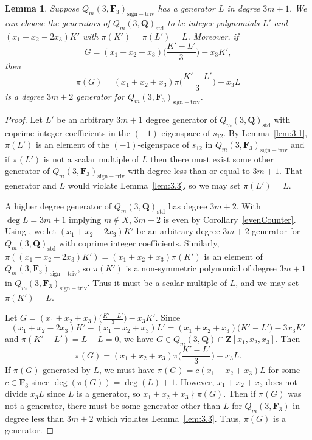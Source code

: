 \documentclass[11pt]{article}
\numberwithin{equation}{section}
\newtheorem{Lemma}[Theorem]{Lemma}
\theoremstyle{definition}
\numberwithin{equation}{section}
\newcommand{\std}{\mathrm{std}}
\newcommand{\siv}{\mathrm{sign-triv}}
\begin{document}
\begin{Lemma}\label{3m+2}
 Suppose $Q_m(3,\mathbf{F}_3)_{\siv}$ has a generator $L$ in degree $3m+1$. We can choose the generators of $Q_m(3,\mathbf{Q})_{\std}$ to be integer polynomials $L'$ and $(x_1+x_2-2x_3)K'$ with $\pi(K')=\pi(L')=L$. Moreover, if
 \[G=(x_1+x_2+x_3)\biggl(\frac{K'-L'}{3}\biggr)-x_3K',\]
 then
 \[\pi(G)= (x_1+x_2+x_3)\pi\biggl(\frac{K'-L'}{3}\biggr)-x_3L\]
 is a degree $3m+2$ generator for $Q_m(3,\mathbf{F}_3)_{\siv}$.
\end{Lemma}
\begin{proof}
 Let $L'$ be an arbitrary $3m+1$ degree generator of $Q_m(3,\mathbf{Q})_{\std}$ with coprime integer coefficients in the $(-1)$-eigenspace of $s_{12}$. By Lemma~\ref{lem:3.1}, $\pi(L')$ is an element of the $(-1)$-eigenspace of $s_{12}$ in $Q_m(3,\mathbf{F}_3)_{\siv}$ and if $\pi(L')$ is not a scalar multiple of $L$ then there must exist some other generator of $Q_m(3,\mathbf{F}_3)_{\siv}$ with degree less than or equal to $3m+1$. That generator and $L$ would violate Lemma~\ref{lem:3.3}, so we may set $\pi(L')=L$.

 A higher degree generator of $Q_m(3,\mathbf{Q})_{\std}$ has degree $3m+2$. With $\deg L=3m+1$ implying $m\not\in X$, $3m+2$ is even by Corollary~\ref{evenCounter}. Using \cite{wang2022explicit}, we let $(x_1+x_2-2x_3)K'$ be an arbitrary degree $3m+2$ generator for $Q_m(3,\mathbf{Q})_{\std}$ with coprime integer coefficients. Similarly, $\pi((x_1+x_2-2x_3)K')= (x_1+x_2+x_3)\pi(K')$ is an element of $Q_m(3,\mathbf{F}_3)_{\siv}$, so $\pi(K')$ is a non-symmetric polynomial of degree $3m+1$ in $Q_m(3,\mathbf{F}_3)_\siv$. Thus it must be a scalar multiple of $L$, and we may set $\pi(K')=L$.

 Let $G=(x_1+x_2+x_3)\big(\frac{K'-L'}{3}\big)-x_3K'$. Since
 \[(x_1+x_2-2x_3)K'-(x_1+x_2+x_3)L' = (x_1+x_2+x_3)\big(K'-L'\big)-3x_3K'\]
 and $\pi(K'-L')=L-L=0$, we have $G\in Q_m(3,\mathbf{Q})\cap \mathbf{Z}[x_1,x_2,x_3]$. Then
 \[\pi(G)= (x_1+x_2+x_3)\pi\biggl(\frac{K'-L'}{3}\biggr)-x_3L.\]
 If $\pi(G)$ generated by $L$, we must have $\pi(G)=c(x_1+x_2+x_3)L$ for some $c\in \mathbf{F}_3$ since $\deg\left(\pi(G)\right)=\deg(L)+1$. However, $x_1+x_2+x_3$ does not divide $x_3L$ since $L$ is a generator, so $x_1+x_2+x_3\nmid \pi(G)$. Then if $\pi(G)$ was not a generator, there must be some generator other than $L$ for $Q_m(3,\mathbf{F}_3)$ in degree less than $3m+2$ which violates Lemma~\ref{lem:3.3}. Thus, $\pi(G)$ is a generator.
\end{proof}
\end{document}

